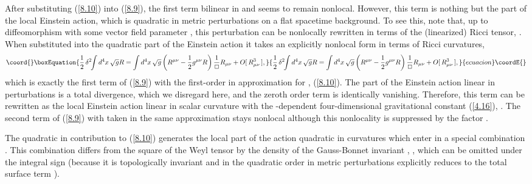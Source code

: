 \documentclass[a4paper,preprint,nofootinbib,
                 showpacs,preprintnumbers,amsmath,amssymb]{revtex4}
\begin{document}
 
After substituting (\ref{8.10}) 
into (\ref{8.9}), the first term bilinear in \coordHE{} and 
\coordHE{} seems to remain nonlocal. However, 
this term is nothing but the part of the local Einstein action, 
which is quadratic in metric perturbations \coordHE{} on a flat spacetime background. To see 
this, note that, up to diffeomorphism with some vector field 
parameter \coordHE{}, this perturbation can be nonlocally rewritten 
in terms of the (linearized) Ricci tensor, 
    \coordHE{}. 
When substituted into the quadratic part of the Einstein action it 
takes an explicitly nonlocal form in terms of Ricci curvatures, 
    \begin{equation}\coord{}\boxEquation{ 
    \frac12\,\delta^2\!\!\int d^4x\, 
    \sqrt{g}R=\int d^4x\,\sqrt{g} 
    \left(R^{\mu\nu}-\frac12 
    g^{\mu\nu}R\right)\frac1\Box R_{\mu\nu} 
    +O[\,R^3_{\mu\nu}\,],                  \label{8.12} 
    }{ 
    \frac12\,\delta^2\!\!\int d^4x\, 
    \sqrt{g}R=\int d^4x\,\sqrt{g} 
    \left(R^{\mu\nu}-\frac12 
    g^{\mu\nu}R\right)\frac1\Box R_{\mu\nu} 
    +O[\,R^3_{\mu\nu}\,],                  }{ecuacion}\coordE{}\end{equation} 
which is exactly the first term of (\ref{8.9}) with the first-order 
in \myHighlight{$\Box$}\coordHE{} approximation for \coordHE{}, (\ref{8.10}). The part 
of the Einstein action linear in perturbations is a total 
divergence, which we disregard here, and the zeroth order term is 
identically vanishing. Therefore, this term can be rewritten as 
the local Einstein action linear in scalar curvature with the 
\coordHE{}-dependent four-dimensional gravitational constant 
(\ref{4.16}), \coordHE{}. The second term of 
(\ref{8.9}) with \coordHE{} taken in the same approximation  
stays nonlocal although this nonlocality is suppressed by the factor 
\coordHE{}. 
 
The quadratic in \myHighlight{$\Box$}\coordHE{} contribution to (\ref{8.10}) generates the  
local part of the action quadratic in curvatures which enter in  
a special combination \coordHE{}. This combination 
differs from the square of the Weyl tensor \coordHE{} 
by the density of the Gauss-Bonnet invariant  
\coordHE{}, 
    \coordHE{}, 
which can be omitted under the integral sign (because it is  
topologically invariant and in the quadratic order in metric 
perturbations explicitly reduces to the total surface term  
\cite{CPT,CPTIII}). 
 
\end{document}
